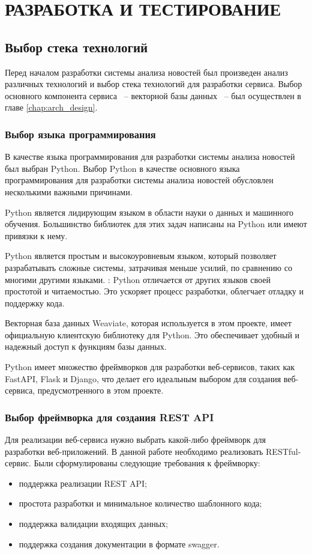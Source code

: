 \chapter{РАЗРАБОТКА И ТЕСТИРОВАНИЕ}
\aftertitle

\section{Выбор стека технологий}

Перед началом разработки системы анализа новостей был произведен анализ различных технологий и выбор стека технологий для разработки сервиса. Выбор основного компонента сервиса ~-- векторной базы данных ~-- был осуществлен в главе \ref{chap:arch_design}.

\subsection{Выбор языка программирования}

В качестве языка программирования для разработки системы анализа новостей был выбран Python. Выбор Python в качестве основного языка программирования для разработки системы анализа новостей обусловлен несколькими важными причинами.

Python является лидирующим языком в области науки о данных и машинного обучения. Большинство библиотек для этих задач написаны на Python или имеют привязки к нему.

Python является простым и высокоуровневым языком, который позволяет разрабатывать сложные системы, затрачивая меньше усилий, по сравнению со многими другими языками. : Python отличается от других языков своей простотой и читаемостью. Это ускоряет процесс разработки, облегчает отладку и поддержку кода.

Векторная база данных Weaviate, которая используется в этом проекте, имеет официальную клиентскую библиотеку для Python. Это обеспечивает удобный и надежный доступ к функциям базы данных.

Python имеет множество фреймворков для разработки веб-сервисов, таких как FastAPI, Flask и Django, что делает его идеальным выбором для создания веб-сервиса, предусмотренного в этом проекте.

\subsection{Выбор фреймворка для создания REST API}

Для реализации веб-сервиса нужно выбрать какой-либо фреймворк для разработки веб-приложений. В данной работе необходимо реализовать RESTful-сервис. Были сформулированы следующие требования к фреймворку:
\begin{itemize}
    \item поддержка реализации REST API;
    \item простота разработки и минимальное количество шаблонного кода;
    \item поддержка валидации входящих данных;
    \item поддержка создания документации в формате swagger.
\end{itemize}


